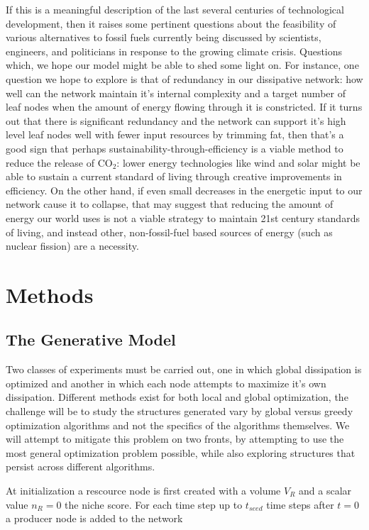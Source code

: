 \documentclass{paper}
\begin{document}
	If this is a meaningful description of the last several centuries of technological development, then it raises some pertinent questions about the feasibility of various alternatives to fossil fuels currently being discussed by scientists, engineers, and politicians in response to the growing climate crisis. Questions which, we hope our model might be able to shed some light on. For instance, one question we hope to explore is that of redundancy in our dissipative network: how well can the network maintain it's internal complexity and a target number of leaf nodes when the amount of energy flowing through it is constricted. If it turns out that there is significant redundancy and the network can support it's high level leaf nodes well with fewer input resources by trimming fat, then that's a good sign that perhaps sustainability-through-efficiency is a viable method to reduce the release of CO$_{2}$: lower energy technologies like wind and solar might be able to sustain a current standard of living through creative improvements in efficiency. On the other hand, if even small decreases in the energetic input to our network cause it to collapse, that may suggest that reducing the amount of energy our world uses is not a viable strategy to maintain 21st century standards of living, and instead other, non-fossil-fuel based sources of energy (such as nuclear fission) are a necessity. 
	
	\section{Methods}
	
	\subsection{The Generative Model}
	
	Two classes of experiments must be carried out, one in which global dissipation is optimized and another in which each node attempts to maximize it's own dissipation. Different methods exist for both local and global optimization, the challenge will be to study the structures generated vary by global versus greedy optimization algorithms and not the specifics of the algorithms themselves. We will attempt to mitigate this problem on two fronts, by attempting to use the most general optimization problem possible, while also exploring structures that persist across different algorithms. 
	
	At initialization a rescource node is first created with a volume $V_R$ and a scalar value $n_R=0$ the niche score. For each time step up to $t_{seed}$ time steps after $t=0$ a producer node is added to the network 
	
\end{document}
